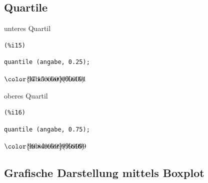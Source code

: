 \documentclass[12pt]{article}
\begin{document}
\subsection{Quartile}


unteres Quartil

\noindent
\begin{minipage}[t]{8ex}{\color{red}\bf
\begin{verbatim}
(%i15) 
\end{verbatim}}
\end{minipage}
\begin{minipage}[t]{\textwidth}{\color{blue}
\begin{verbatim}
quantile (angabe, 0.25);
\end{verbatim}}
\end{minipage}
\begin{math}\displaystyle
\parbox{8ex}{\color{labelcolor}(\%o15) }
97.15000000000001
\end{math}

oberes Quartil

\noindent
\begin{minipage}[t]{8ex}{\color{red}\bf
\begin{verbatim}
(%i16) 
\end{verbatim}}
\end{minipage}
\begin{minipage}[t]{\textwidth}{\color{blue}
\begin{verbatim}
quantile (angabe, 0.75);
\end{verbatim}}
\end{minipage}
\begin{math}\displaystyle
\parbox{8ex}{\color{labelcolor}(\%o16) }
99.84999999999999
\end{math}


\subsection{Grafische Darstellung mittels Boxplot}
\end{document}
